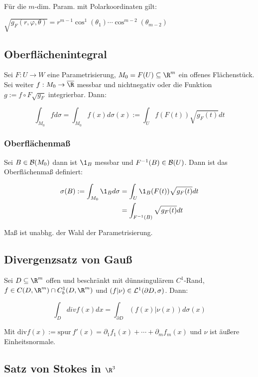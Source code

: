 \spacing

Für die $m$-dim. Param. mit Polarkoordinaten gilt:

$\sqrt{g_F(r,\varphi,\theta)} = r^{m-1} \cos^1(\theta_1) \cdots \cos^{m-2}(\theta_{m-2})$

\subsection*{Oberflächenintegral}

Sei $F : U \to W$ eine Parametrisierung, $M_0 = F(U) \subseteq \R^m$ ein offenes Flächenstück. Sei weiter $f : M_0 \to \overline\R$ messbar und nichtnegativ oder die Funktion $g := f \circ F \sqrt{g_F}$ integrierbar. Dann:

\vspace{-4mm}
$$\int_{M_0} f d\sigma = \int_{M_0} f(x) d\sigma(x) := \int_U f(F(t))\sqrt{g_F(t)} dt$$

\subsubsection*{Oberflächenmaß}

Sei $B \in \mathcal{B}(M_0)$ dann ist $\1_B$ messbar und $F^{-1}(B) \in \mathcal{B}(U)$. Dann ist das Oberflächenmaß definiert:

\vspace{-4mm}
\begin{align*}
\sigma(B) := \int_{M_0} \1_B d\sigma &= \int_U \1_B(F(t)) \sqrt{g_F(t)} dt\\
                             &= \int_{F^{-1}(B)} \sqrt{g_F(t)} dt
\end{align*}

Maß ist unabhg. der Wahl der Parametrisierung.

\subsection*{Divergenzsatz von Gauß}

Sei $D \subseteq \R^m$ offen und beschränkt mit dünnsingulärem $C^1$-Rand, $f \in C(D,\R^m) \cap C_b^1(D,\R^m)$ und $(f|\nu) \in \mathcal{L}^1(\partial D,\sigma)$. Dann:

$$\int_D div f(x) dx = \int_{\partial D} (f(x)|\nu(x)) d\sigma(x)$$

Mit $\text{div} f(x) := \text{spur} \ f'(x) = \partial_1 f_1(x) + \cdots + \partial_m f_m(x)$ und $\nu$ ist äußere Einheitsnormale.

\subsection*{Satz von Stokes in $\R^3$}

